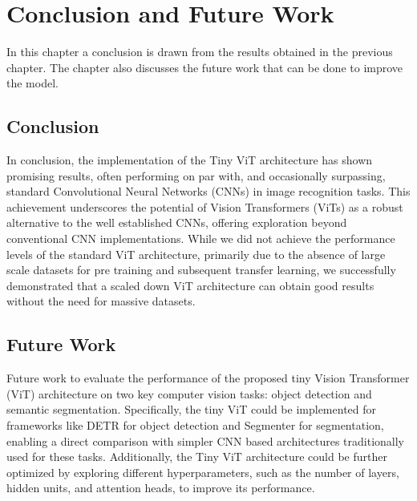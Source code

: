 \section{Conclusion and Future Work}
In this chapter a conclusion is drawn from the results obtained in the previous chapter. The chapter also discusses the future work that can be done to improve the model.

\subsection{Conclusion}
In conclusion, the implementation of the Tiny ViT architecture has shown promising results, often performing on par with, and occasionally surpassing, standard Convolutional Neural Networks (CNNs) in image recognition tasks. This achievement underscores the potential of Vision Transformers (ViTs) as a robust alternative to the well established CNNs, offering exploration beyond conventional CNN implementations. While we did not achieve the performance levels of the standard ViT architecture, primarily due to the absence of large scale datasets for pre training and subsequent transfer learning, we successfully demonstrated that a scaled down ViT architecture can obtain good results without the need for massive datasets.
\subsection{Future Work}
Future work to evaluate the performance of the proposed tiny Vision Transformer (ViT) architecture on two key computer vision tasks: object detection and semantic segmentation. Specifically, the tiny ViT could be implemented for frameworks like DETR \cite{carion2020end} for object detection and Segmenter \cite{strudel2021segmenter} for segmentation, enabling a direct comparison with simpler CNN based architectures traditionally used for these tasks. Additionally, the Tiny ViT architecture could be further optimized by exploring different hyperparameters, such as the number of layers, hidden units, and attention heads, to improve its performance.